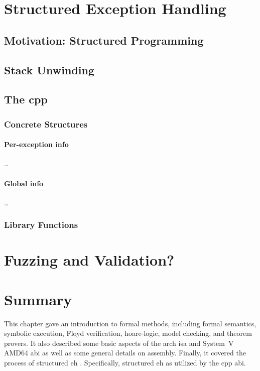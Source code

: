 \section{Structured Exception Handling}\label{se:structured_exceptions}

\subsection{Motivation: Structured Programming}

\subsection{Stack Unwinding}

\subsection{The \texorpdfstring\gls{cpp}{C++} }

\subsubsection{Concrete Structures}

\paragraph{Per-exception info}
\todo\dots
\paragraph{Global info}
\todo\dots

\subsubsection{Library Functions}

\section{Fuzzing and Validation?}

\section{Summary}
This chapter gave an introduction to formal methods, including formal semantics,
symbolic execution, Floyd verification, \gls{hoare-logic}, model checking, and theorem provers.
It also described some basic aspects of the \gls{arch} \gls{isa} and System~V
AMD64 \gls{abi}
as well as some general details on assembly.
Finally, it covered the process of structured \gls{eh}%
.
Specifically, structured \gls{eh} as utilized by the \gls{cpp} \gls{abi}.
